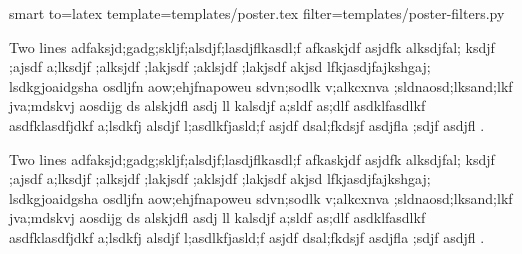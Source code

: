 \documentclass{article}
\begin{document}



smart
to=latex
template=templates/poster.tex
filter=templates/poster-filters.py


\vskip 3cm

Two lines adfaksjd;gadg;skljf;alsdjf;lasdjflkasdl;f afkaskjdf asjdfk alksdjfal; ksdjf ;ajsdf a;lksdjf ;alksjdf ;lakjsdf ;aklsjdf ;lakjsdf akjsd lfkjasdjfajkshgaj; lsdkgjoaidgsha osdljfn aow;ehjfnapoweu sdvn;sodlk v;alkcxnva ;sldnaosd;lksand;lkf jva;mdskvj aosdijg  ds alskjdfl asdj ll  kalsdjf a;sldf as;dlf asdklfasdlkf asdfklasdfjdkf a;lsdkfj alsdjf l;asdlkfjasld;f asjdf dsal;fkdsjf asdjfla ;sdjf asdjfl .




Two lines adfaksjd;gadg;skljf;alsdjf;lasdjflkasdl;f afkaskjdf asjdfk alksdjfal; ksdjf ;ajsdf a;lksdjf ;alksjdf ;lakjsdf ;aklsjdf ;lakjsdf akjsd lfkjasdjfajkshgaj; lsdkgjoaidgsha osdljfn aow;ehjfnapoweu sdvn;sodlk v;alkcxnva ;sldnaosd;lksand;lkf jva;mdskvj aosdijg  ds alskjdfl asdj ll  kalsdjf a;sldf as;dlf asdklfasdlkf asdfklasdfjdkf a;lsdkfj alsdjf l;asdlkfjasld;f asjdf dsal;fkdsjf asdjfla ;sdjf asdjfl .
\end{document}
